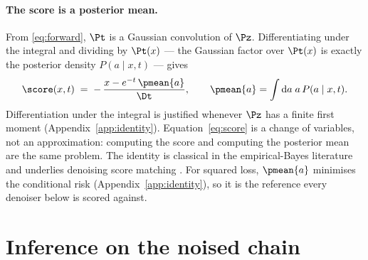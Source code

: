\documentclass{article}
\begin{document}
\paragraph{The score is a posterior mean.} From \eqref{eq:forward}, $\Pt$ is a Gaussian
convolution of $\Pz$. Differentiating under the integral and dividing by $\Pt(x)$ --- the
Gaussian factor over $\Pt(x)$ is exactly the posterior density $P(a\mid x,t)$ --- gives
\begin{equation}
\label{eq:score}
\score(x,t) \;=\; -\,\frac{x - e^{-t}\,\pmean{a}}{\Dt},
\qquad
\pmean{a} = \int \mathrm{d}a\; a\, P(a\mid x,t).
\end{equation}
Differentiation under the integral is justified whenever $\Pz$ has a finite first moment
(Appendix~\ref{app:identity}). Equation~\eqref{eq:score} is a change of variables, not an
approximation: computing the score and computing the posterior mean are the same problem. The
identity is classical in the empirical-Bayes literature
\citep{robbins1956,miyasawa1961,efron2011} and underlies denoising score matching
\citep{vincent2011,hyvarinen2005}. For squared loss, $\pmean{a}$ minimises the conditional risk
(Appendix~\ref{app:identity}), so it is the reference every denoiser below is scored against.

\section{Inference on the noised chain}
\label{sec:bp}
\end{document}
